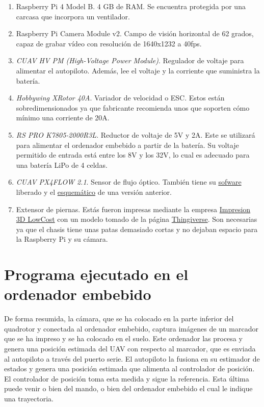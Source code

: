 \begin{enumerate}
\item Raspberry Pi 4 Model B. 4 GB de RAM. Se encuentra protegida por una carcasa que incorpora un ventilador. 
\item Raspberry Pi Camera Module v2. Campo de visión horizontal de 62 grados, capaz de grabar vídeo con resolución de 1640x1232 a 40fps.
\item \textit{CUAV HV PM (High-Voltage Power Module)}. Regulador de voltaje para alimentar el autopiloto. Además, lee el voltaje y la corriente que suministra la batería. 
\item \textit{Hobbywing XRotor 40A}. Variador de velocidad o ESC. Estos están sobredimensionados ya que fabricante recomienda unos que soporten cómo mínimo una corriente de 20A.
\item \textit{RS PRO K7805-2000R3L}. Reductor de voltaje de 5V y 2A. Este se utilizará para alimentar el ordenador embebido a partir de la batería. Su voltaje permitido de entrada está entre los 8V y los 32V, lo cual es adecuado para una batería LiPo de 4 celdas. 
\item \textit{CUAV PX4FLOW 2.1}. Sensor de flujo óptico. También tiene su \href{https://github.com/PX4/PX4-Flow}{sofware} liberado y el \href{https://github.com/pixhawk/Hardware/tree/master/FLOWv1}{esquemático} de una versión anterior.
\item Extensor de piernas. Estás fueron impresas mediante la empresa \href{https://impresion3dlowcost.es/}{Impresion 3D LowCost} con un modelo tomado de la página \href{https://www.thingiverse.com/thing:915639}{Thingiverse}. Son necesarias ya que el chasis tiene unas patas demasiado cortas y no dejaban espacio para la Raspberry Pi y su cámara. 
\end{enumerate}



\section{Programa ejecutado en el ordenador embebido}\label{sec:programa}
De forma resumida, la cámara, que se ha colocado en la parte inferior del quadrotor y conectada al ordenador embebido, captura imágenes de un marcador que se ha impreso y se ha colocado en el suelo. Este ordenador las procesa y genera una posición estimada del UAV con respecto al marcador, que es enviada al autopiloto a través del puerto serie. El autopiloto la fusiona en su estimador de estados y genera una posición estimada que alimenta al controlador de posición.  El controlador de posición toma esta medida y sigue la referencia. Esta última puede venir o bien del mando, o bien del ordenador embebido el cual le indique una trayectoria.

